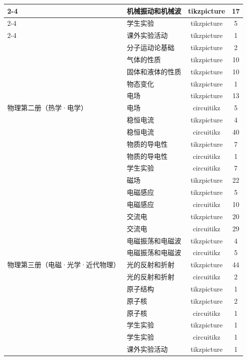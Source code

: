 \begin{center}
\begin{longtable}{|p{4.5cm}|p{5cm}|c|c|}
\cline{2-4}
 & 机械振动和机械波 & tikzpicture & 17 \\
\cline{2-4}
 & 学生实验 & tikzpicture & 5 \\
\cline{2-4}
 & 课外实验活动 & tikzpicture & 1 \\
\hline
\multirow{11}{*}{物理第二册（热学·电学）} & 分子运动论基础 & tikzpicture & 2 \\
\cline{2-4}
 & 气体的性质 & tikzpicture & 10 \\
\cline{2-4}
 & 固体和液体的性质 & tikzpicture & 10 \\
\cline{2-4}
 & 物态变化 & tikzpicture & 1 \\
\cline{2-4}
 & 电场 & tikzpicture & 13 \\
\cline{2-4}
 & 电场 & circuitikz & 5 \\
\cline{2-4}
 & 稳恒电流 & tikzpicture & 4 \\
\cline{2-4}
 & 稳恒电流 & circuitikz & 40 \\
\cline{2-4}
 & 物质的导电性 & tikzpicture & 7 \\
\cline{2-4}
 & 物质的导电性 & circuitikz & 1 \\
\cline{2-4}
 & 学生实验 & circuitikz & 7 \\
\hline
\multirow{15}{*}{物理第三册（电磁·光学·近代物理）} & 磁场 & tikzpicture & 22 \\
\cline{2-4}
 & 电磁感应 & tikzpicture & 5 \\
\cline{2-4}
 & 电磁感应 & circuitikz & 10 \\
\cline{2-4}
 & 交流电 & tikzpicture & 20 \\
\cline{2-4}
 & 交流电 & circuitikz & 29 \\
\cline{2-4}
 & 电磁振荡和电磁波 & tikzpicture & 4 \\
\cline{2-4}
 & 电磁振荡和电磁波 & circuitikz & 5 \\
\cline{2-4}
 & 光的反射和折射 & tikzpicture & 44 \\
\cline{2-4}
 & 光的反射和折射 & circuitikz & 2 \\
\cline{2-4}
 & 原子结构 & tikzpicture & 1 \\
\cline{2-4}
 & 原子核 & tikzpicture & 2 \\
\cline{2-4}
 & 原子核 & circuitikz & 1 \\
\cline{2-4}
 & 学生实验 & tikzpicture & 1 \\
\cline{2-4}
 & 学生实验 & circuitikz & 1 \\
\cline{2-4}
 & 课外实验活动 & tikzpicture & 1 \\
\hline
\end{longtable}
\end{center}
